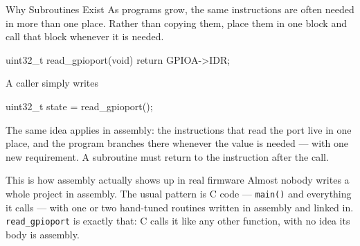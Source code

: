 \documentclass[9pt,aspectratio=169,xcolor=table]{beamer}
\begin{document}
\begin{frame}[fragile]{Why Subroutines Exist}
	\leavevmode
	{\small As programs grow, the same instructions are often needed in more
	than one place. Rather than copying them, place them in one block and
	\alert{call} that block whenever it is needed.}

	\vspace{1mm}
	\begin{cc}
uint32_t read_gpioport(void) {
    return GPIOA->IDR;
}
\end{cc}

	\vspace{2mm}
	{\small A caller simply writes}
	\begin{cc}
uint32_t state = read_gpioport();
\end{cc}

	\vspace{0mm}
	{\small The same idea applies in assembly: the instructions that read the
	port live in one place, and the program branches there whenever the
	value is needed --- with one new requirement. A subroutine must
	\alert{return to the instruction after the call}.}

	\vspace{1mm}
	\begin{block}{This is how assembly actually shows up in real firmware}
		Almost nobody writes a whole project in assembly. The usual pattern
		is \alert{C code --- \texttt{main()} and everything it calls ---
		with one or two hand-tuned routines written in assembly and linked
		in}. \texttt{read\_gpioport} is exactly that: C calls it like any
		other function, with no idea its body is assembly.
	\end{block}
\end{frame}
\end{document}
